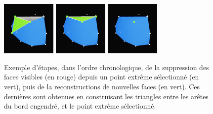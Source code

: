 \documentclass[]{article}
\begin{document}
\begin{figure}[H]
\begin{center}
		\includegraphics[width=2.65cm]{qh3d/demo3d/add_rem_3.png}
		\includegraphics[width=2.65cm]{qh3d/demo3d/add_rem_2.png}
		\includegraphics[width=2.65cm]{qh3d/demo3d/add_rem_1.png}
	\end{center}
	\caption{Exemple d'étapes, dans l'ordre chronologique, de la suppression des faces visibles (en rouge) depuis un point extrême sélectionné (en vert), puis de la reconstructions de nouvelles faces (en vert). Ces dernières sont obtenues en construisant les triangles entre les arêtes du bord engendré, et le point extrême sélectionné.}
	\label{demo_visuelle_3d_js_fig_a}
\end{figure}
\end{document}
